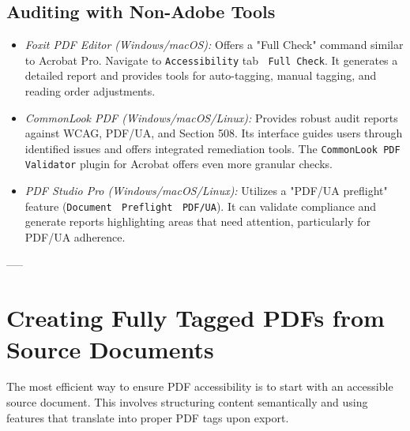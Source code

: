 \subsection{Auditing with Non-Adobe Tools}
\label{subsec:auditing-non-adobe}

\begin{itemize}
\item \emph{Foxit PDF Editor (Windows/macOS):} Offers a "Full Check" command similar to Acrobat Pro. Navigate to \texttt{Accessibility} tab $\>$ \texttt{Full Check}. It generates a detailed report and provides tools for auto-tagging, manual tagging, and reading order adjustments.
\item \emph{CommonLook PDF (Windows/macOS/Linux):} Provides robust audit reports against WCAG, PDF/UA, and Section 508. Its interface guides users through identified issues and offers integrated remediation tools. The \texttt{CommonLook PDF Validator} plugin for Acrobat offers even more granular checks.
\item \emph{PDF Studio Pro (Windows/macOS/Linux):} Utilizes a "PDF/UA preflight" feature (\texttt{Document} $\>$ \texttt{Preflight} $\>$ \texttt{PDF/UA}). It can validate compliance and generate reports highlighting areas that need attention, particularly for PDF/UA adherence.
\end{itemize}

-----

\section{Creating Fully Tagged PDFs from Source Documents}
\label{sec:tagged-pdfs-source}
The most efficient way to ensure PDF accessibility is to start with an accessible source document. This involves structuring content semantically and using features that translate into proper PDF tags upon export.

